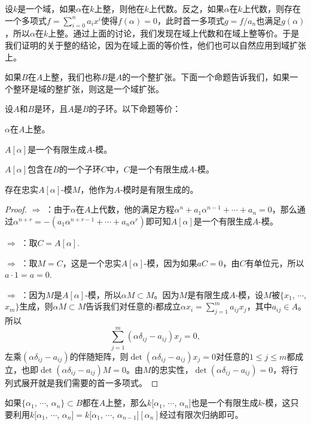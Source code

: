 设$k$是一个域，如果$\alpha$在$k$上整，则他在$k$上代数。反之，如果$\alpha$在$k$上代数，则存在一个多项式$f=\sum_{i=0}^na_ix^i$使得$f(\alpha)=0$，此时首一多项式$g=f/a_n$也满足$g(\alpha)$，所以$\alpha$在$k$上整。通过上面的讨论，我们发现在域上代数和在域上整等价。于是我们证明的关于整的结论，因为在域上面的等价性，他们也可以自然应用到域扩张上。

如果$B$在$A$上整，我们也称$B$是$A$的一个整扩张。下面一个命题告诉我们，如果一个整环是域的整扩张，则这是一个域扩张。

\begin{pro}\label{p2:1}
	设$A$和$B$是环，且$A$是$B$的子环。以下命题等价：
	\begin{compactenum}[~~~(1)]
		\item $\alpha$在$A$上整。
		\item $A[\alpha]$是一个有限生成$A$-模。
		\item $A[\alpha]$包含在$B$的一个子环$C$中，$C$是一个有限生成$A$-模。
		\item 存在忠实$A[\alpha]$-模$M$，他作为$A$-模时是有限生成的。
	\end{compactenum}
\end{pro}	

\begin{proof} 
	 $\Rightarrow$  ：由于$\alpha$在$A$上代数，他的满足方程$\alpha^n+a_1\alpha^{n-1}+\cdots+a_n=0$，那么通过$\alpha^{n+r}=-(a_1\alpha^{n+r-1}+\cdots+a_n\alpha^r)$即可知$A[\alpha]$是一个有限生成$A$-模。

	 $\Rightarrow$  ：取$C=A[\alpha]$.

	 $\Rightarrow$  ：取$M=C$，这是一个忠实$A[\alpha]$-模，因为如果$aC=0$，由$C$有单位元，所以$a\cdot 1=a=0$.

	 $\Rightarrow$  ：因为$M$是$A[\alpha]$-模，所以$\alpha M\subset M$。因为$M$是有限生成$A$-模，设$M$被$\{x_1$, $\cdots$, $x_m\}$生成，则$\alpha M\subset M$告诉我们对任意的$i$都成立$\alpha x_i=\sum_{j=1}^m a_{ij} x_j$，其中$a_{ij}\in A$。所以
	\[
		\sum_{j=1}^m (\alpha\delta_{ij} -a_{ij})x_j=0,
	\]
	左乘$(\alpha\delta_{ij} -a_{ij})$的伴随矩阵，则$\det(\alpha\delta_{ij} -a_{ij})x_j=0$对任意的$1\leq j \leq m$都成立，也即$\det(\alpha\delta_{ij} -a_{ij})M=0$。由$M$的忠实性，$\det(\alpha\delta_{ij} -a_{ij})=0$，将行列式展开就是我们需要的首一多项式。
\end{proof}

如果$\{\alpha_1$, $\cdots$, $\alpha_n\}\subset B$都在$A$上整，那么$k[\alpha_1$, $\cdots$, $\alpha_n]$也是一个有限生成$k$-模，这只要利用$k[\alpha_1$, $\cdots$, $\alpha_n]=k[\alpha_1$, $\cdots$, $\alpha_{n-1}][\alpha_n]$经过有限次归纳即可。

